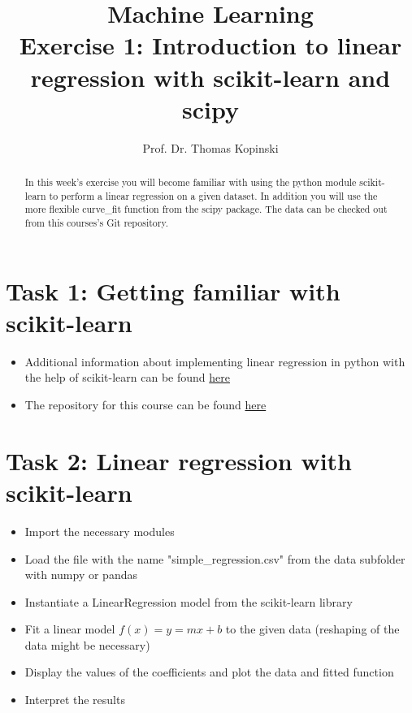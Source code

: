 \documentclass{article}
\title{Machine Learning \\ Exercise 1: Introduction to linear regression with scikit-learn and scipy}
\author{Prof. Dr. Thomas Kopinski}
\begin{document}
\maketitle

\begin{abstract}
In this week's exercise you will become familiar with using the python module scikit-learn to perform a linear regression on a given dataset. In addition you will use the more flexible curve\_fit function from the scipy package. The data can be checked out from this courses's Git repository. 
\end{abstract}

\section*{Task 1: Getting familiar with scikit-learn}

\begin{itemize}
    \item Additional information about implementing linear regression in python with the help of scikit-learn can be found  \href{https://github.com/DataScienceLabFHSWF/machine-learning-book/blob/main/notebooks/ch09/ch09.ipynb}{here}
    \item The repository for this course can be found \href{https://github.com/DataScienceLabFHSWF/MachineLearningCourse}{here}
\end{itemize}
\section*{Task 2: Linear regression with scikit-learn}
\begin{itemize}
    \item Import the necessary modules
    \item Load the file with the name "simple\_regression.csv" from the data subfolder with numpy or pandas 
    \item Instantiate a LinearRegression model from the scikit-learn library
    \item Fit a linear model $f(x) = y = mx+b$ to the given data (reshaping of the data might be necessary)
    \item Display the values of the coefficients and plot the data and fitted function
    \item Interpret the results
\end{itemize}
\end{document}
